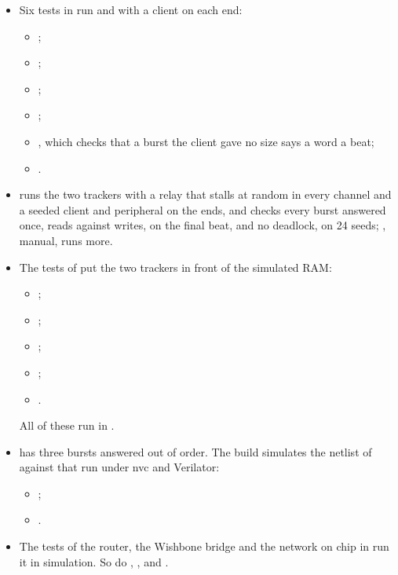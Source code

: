 \begin{itemize}
\item Six tests in  run 
and  with a client on each end:
\begin{itemize}
\item {};
\item {};
\item {};
\item {};
\item {}, which checks that a
burst the client gave no size says a word a beat;
\item {}.
\end{itemize}
\item {} runs the two trackers with a relay that
stalls at random in every channel and a seeded client and peripheral
on the ends, and checks every burst answered once, reads against
writes,  on the final beat, and no deadlock, on 24 seeds;
, manual, runs more.
\item The tests of  put the two trackers in front
of the simulated RAM:
\begin{itemize}
\item {};
\item {};
\item {};
\item {};
\item {}.
\end{itemize}
All of these run in .
\item {} has three bursts answered out of order. The build
simulates the netlist of  against that run
under nvc and Verilator:
\begin{itemize}
\item {};
\item {}.
\end{itemize}
\item The tests of the router, the Wishbone bridge and the network on
chip in  run it in simulation. So do
, ,
 and .
\end{itemize}

